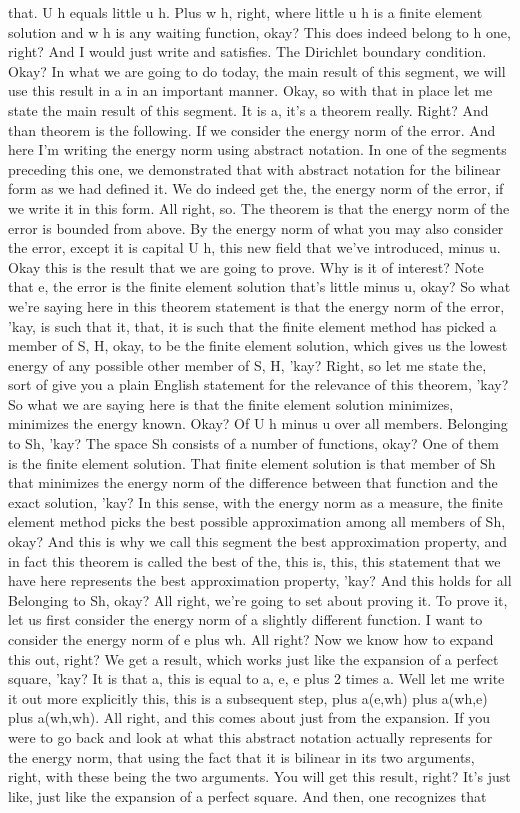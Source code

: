 \documentclass[10pt]{article}
\begin{document}
{that. U h equals little u h. Plus w h, right, where little u h is a finite element solution and w h is any waiting function, okay? This does indeed belong to h one, right? And I would just write and satisfies. The Dirichlet boundary condition. Okay? In what we are going to do today, the main result of this segment, we will use this result in a in an important manner. Okay, so with that in place let me state the main result of this segment. It is a, it's a theorem really. Right? And than theorem is the following. If we consider the energy norm of the error. And here I'm writing the energy norm using abstract notation. In one of the segments preceding this one, we demonstrated that with abstract notation for the bilinear form as we had defined it. We do indeed get the, the energy norm of the error, if we write it in this form. All right, so. The theorem is that the energy norm of the error is bounded from above. By the energy norm of what you may also consider the error, except it is capital U h, this new field that we've introduced, minus u. Okay this is the result that we are going to prove. Why is it of interest? Note that e, the error is the finite element solution that's little minus u, okay? So what we're saying here in this theorem statement is that the energy norm of the error, 'kay, is such that it, that, it is such that the finite element method has picked a member of S, H, okay, to be the finite element solution, which gives us the lowest energy of any possible other member of S, H, 'kay? Right, so let me state the, sort of give you a plain English statement for the relevance of this theorem, 'kay? So what we are saying here is that the finite element solution minimizes, minimizes the energy known. Okay? Of U h minus u over all members. Belonging to Sh, 'kay? The space Sh consists of a number of functions, okay? One of them is the finite element solution. That finite element solution is that member of Sh that minimizes the energy norm of the difference between that function and the exact solution, 'kay? In this sense, with the energy norm as a measure, the finite element method picks the best possible approximation among all members of Sh, okay? And this is why we call this segment the best approximation property, and in fact this theorem is called the best of the, this is, this, this statement that we have here represents the best approximation property, 'kay? And this holds for all Belonging to Sh, okay? All right, we're going to set about proving it. To prove it, let us first consider the energy norm of a slightly different function. I want to consider the energy norm of e plus wh. All right? Now we know how to expand this out, right? We get a result, which works just like the expansion of a perfect square, 'kay? It is that a, this is equal to a, e, e plus 2 times a. Well let me write it out more explicitly this, this is a subsequent step, plus a(e,wh) plus a(wh,e) plus a(wh,wh). All right, and this comes about just from the expansion. If you were to go back and look at what this abstract notation actually represents for the energy norm, that using the fact that it is bilinear in its two arguments, right, with these being the two arguments. You will get this result, right? It's just like, just like the expansion of a perfect square. And then, one recognizes that }
\end{document}

